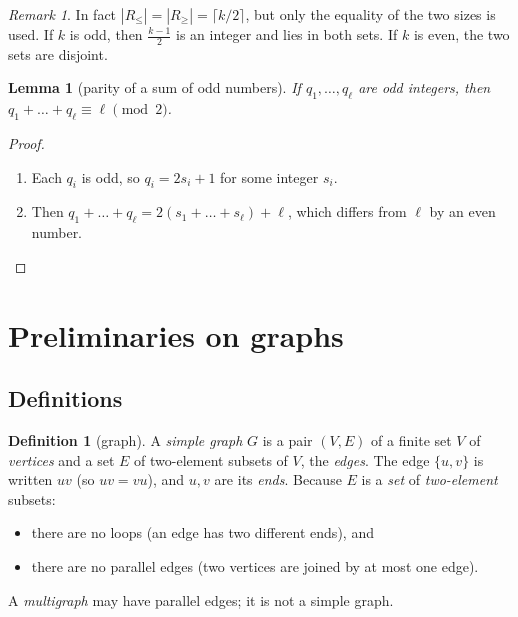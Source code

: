 \documentclass[11pt]{article}
\theoremstyle{plain}
\newtheorem{lemma}[theorem]{Lemma}
\theoremstyle{definition}
\newtheorem{definition}[theorem]{Definition}
\theoremstyle{remark}
\newtheorem{remark}[theorem]{Remark}
\newcommand{\half}{\tfrac{k-1}{2}}
\newenvironment{steps}{\begin{enumerate}[label=(\arabic*),leftmargin=2.2em,itemsep=0.35em]}{\end{enumerate}}
\begin{document}
\begin{remark}
In fact $|R_{\le}|=|R_{\ge}|=\lceil k/2\rceil$, but only the equality of the two sizes is used.
If $k$ is odd, then $\half$ is an integer and lies in both sets. If $k$ is even, the two sets are
disjoint.
\end{remark}

\begin{lemma}[parity of a sum of odd numbers]\label{lem:parity}
If $q_1,\dots,q_\ell$ are odd integers, then $q_1+\dots+q_\ell\equiv\ell\pmod 2$.
\end{lemma}

\begin{proof}
\begin{steps}
  \item Each $q_i$ is odd, so $q_i=2s_i+1$ for some integer $s_i$.
  \item Then $q_1+\dots+q_\ell=2(s_1+\dots+s_\ell)+\ell$, which differs from $\ell$ by an even
    number. \qedhere
\end{steps}
\end{proof}

\section{Preliminaries on graphs}\label{sec:graphs}

\subsection{Definitions}

\begin{definition}[graph]\label{def:graph}
A \emph{simple graph} $G$ is a pair $(V,E)$ of a finite set $V$ of \emph{vertices} and a set $E$
of two-element subsets of $V$, the \emph{edges}. The edge $\{u,v\}$ is written $uv$ (so $uv=vu$),
and $u,v$ are its \emph{ends}. Because $E$ is a \emph{set} of \emph{two-element} subsets:
\begin{itemize}
  \item there are no loops (an edge has two different ends), and
  \item there are no parallel edges (two vertices are joined by at most one edge).
\end{itemize}
A \emph{multigraph} may have parallel edges; it is not a simple graph.
\end{definition}
\end{document}
